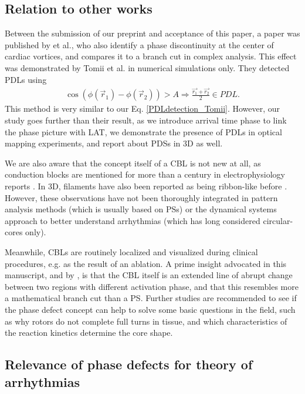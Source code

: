 \documentclass[aps,pre,amsfonts,amssymb,amsmath,twocolumn, superscriptaddress]{revtex4-1}
\begin{document}
\subsection{Relation to other works}

Between the submission of our preprint \cite{Arno:2021arxiv} and acceptance of this paper, a paper was published by \cite{Tomii:2021} et al., who also identify a phase discontinuity at the center of cardiac vortices, and compares it to a branch cut in complex analysis. This effect was demonstrated by Tomii et al. in numerical simulations only. They detected PDLs using
\begin{align}
\cos ( \phi(\vec{r}_1) - \phi(\vec{r}_2)) > A     \Rightarrow \frac{\vec{r_1} + \vec{r_2}}{2} \in PDL.  \label{PDLdetection_Tomii}
\end{align}
This method is very similar to our Eq. \eqref{PDLdetection_Tomii}. However, our study goes further than their result, as we introduce arrival time phase to link the phase picture with LAT, we demonstrate the presence of PDLs in optical mapping experiments, and report about PDSs in 3D as well. 

We are also aware that the concept itself of a CBL is not new at all, as conduction blocks are mentioned for more than a century in electrophysiology reports \citep{Mines:1913}. In 3D, filaments have also been reported as being ribbon-like before \citep{Efimov:1999}. However, these observations have not been thoroughly integrated in pattern analysis methods (which is usually based on PSs) or the dynamical systems approach to better understand arrhythmias (which has long considered circular-cores only). 

Meanwhile, CBLs are routinely localized and visualized during clinical procedures, e.g. as the result of an ablation. A prime insight advocated in this manuscript, and by \cite{Tomii:2021}, is that the CBL itself is an extended line of abrupt change between two regions with different activation phase, and that this resembles more a mathematical branch cut than a PS. Further studies are recommended to see if the phase defect concept can help to solve some basic questions in the field, such as why rotors do not complete full turns in tissue, and which characteristics of the reaction kinetics determine the core shape. 

\subsection{Relevance of phase defects for theory of arrhythmias}
\end{document}
